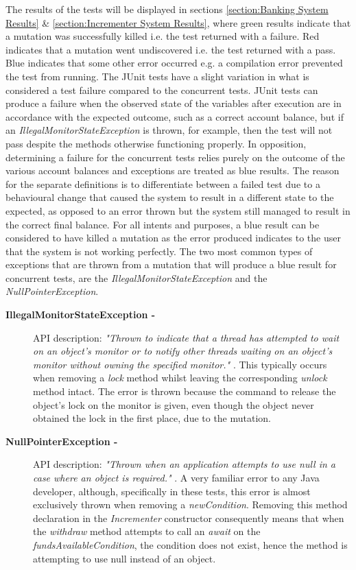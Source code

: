 \documentclass[a4paper,12pt]{article}
\begin{document}
The results of the tests will be displayed in sections \ref{section:Banking System Results} \& \ref{section:Incrementer System Results}, where green results indicate that a mutation was successfully killed i.e. the test returned with a failure. Red indicates that a mutation went undiscovered i.e. the test returned with a pass. Blue indicates that some other error occurred e.g. a compilation error prevented the test from running. The JUnit tests have a slight variation in what is considered a test failure compared to the concurrent tests. JUnit tests can produce a failure when the observed state of the variables after execution are in accordance with the expected outcome, such as a correct account balance, but if an \textit{IllegalMonitorStateException} is thrown, for example, then the test will not pass despite the methods otherwise functioning properly. In opposition, determining a failure for the concurrent tests relies purely on the outcome of the various account balances and exceptions are treated as blue results. The reason for the separate definitions is to differentiate between a failed test due to a behavioural change that caused the system to result in a different state to the expected, as opposed to an error thrown but the system still managed to result in the correct final balance. For all intents and purposes, a blue result can be considered to have killed a mutation as the error produced indicates to the user that the system is not working perfectly. 
The two most common types of exceptions that are thrown from a mutation that will produce a blue result for concurrent tests, are the \textit{IllegalMonitorStateException} and the \textit{NullPointerException}. 

\begin{description}
    \item[\textbf{IllegalMonitorStateException -}]API description: \textit{"Thrown to indicate that a thread has attempted to wait on an object's monitor or to notify other threads waiting on an object's monitor without owning the specified monitor."} \citep{imse18}. This typically occurs when removing a \textit{lock} method whilst leaving the corresponding \textit{unlock} method intact. The error is thrown because the command to release the object's lock on the monitor is given, even though the object never obtained the lock in the first place, due to the mutation. 

    \item[\textbf{NullPointerException - }] API description: \textit{"Thrown when an application attempts to use null in a case where an object is required."} \citep{npe18}. A very familiar error to any Java developer, although, specifically in these tests, this error is almost exclusively thrown when removing a \textit{newCondition}. Removing this method declaration in the \textit{Incrementer} constructor consequently means that when the \textit{withdraw} method attempts to call an \textit{await} on the \textit{fundsAvailableCondition}, the condition does not exist, hence the method is attempting to use null instead of an object.  
\end{description}
\end{document}
